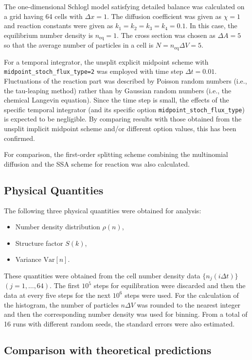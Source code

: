 \documentclass{article}
\begin{document}
The one-dimensional Schlogl model satisfying detailed balance was calculated on a grid having 64 cells with $\Delta x=1$.
The diffusion coefficient was given as $\chi=1$ and reaction constants were given as $k_1=k_2=k_3=k_4=0.1$.
In this case, the equilibrium number density is $n_\mathrm{eq}=1$.
The cross section was chosen as $\Delta A=5$ so that the average number of particles in a cell is $N=n_\mathrm{eq}\Delta V=5$.

For a temporal integrator, the unsplit explicit midpoint scheme with \texttt{midpoint\_stoch\_flux\_type=2} was employed with time step $\Delta t=0.01$.
Fluctuations of the reaction part was described by Poisson random numbers (i.e., the tau-leaping method) rather than by Gaussian random numbers (i.e., the chemical Langevin equation). 
Since the time step is small, the effects of the specific temporal integrator (and its specific option \texttt{midpoint\_stoch\_flux\_type}) is expected to be negligible.
By comparing results with those obtained from the unsplit implicit midpoint scheme and/or different option values, this has been confirmed. 

For comparison, the first-order splitting scheme combining the multinomial diffusion and the SSA scheme for reaction was also calculated.

\subsection{Physical Quantities}

The following three physical quantities were obtained for analysis:
\begin{itemize}
\item Number density distribution $\rho(n)$,
\item Structure factor $S(k)$,
\item Variance $\mathrm{Var}[n]$.
\end{itemize}

These quantities were obtained from the cell number density data $\{n_j(i\Delta t)\}$ $(j=1,\dots,64)$.
The first $10^5$ steps for equilibration were discarded and then the data at every five steps for the next $10^6$ steps were used.
For the calculation of the histogram, the number of particles $n\Delta V$ was rounded to the nearest integer and then the corresponding number density was used for binning.
From a total of 16 runs with different random seeds, the standard errors were also estimated.   

\subsection{Comparison with theoretical predictions}
\end{document}
